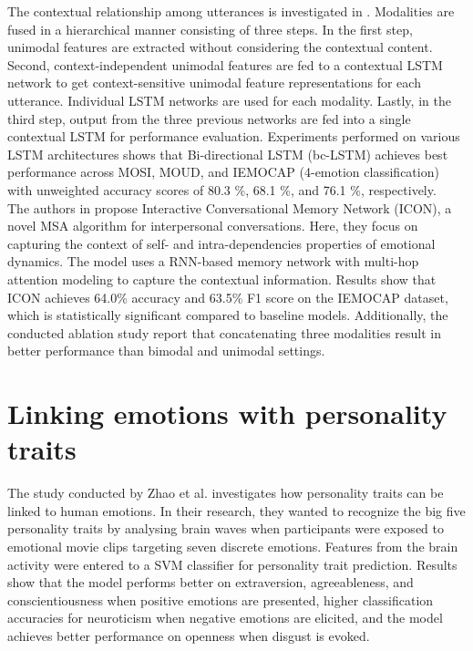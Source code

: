 The contextual relationship among utterances is investigated in \cite{bc-LSTM_poria2017context}. Modalities are fused in a hierarchical manner consisting of three steps. In the first step, unimodal features are extracted without considering the contextual content. Second, context-independent  unimodal features are fed to a contextual LSTM network to get context-sensitive unimodal feature representations for each utterance. Individual LSTM networks are used for each modality. Lastly, in the third step, output from the three previous networks are fed into a single contextual LSTM for performance evaluation. Experiments performed on various LSTM architectures shows that Bi-directional LSTM (bc-LSTM) achieves best performance across MOSI, MOUD, and IEMOCAP (4-emotion classification) with unweighted accuracy scores of 80.3 \%, 68.1 \%, and 76.1 \%, respectively. \\

The authors in \cite{ICON_hazarika-etal-2018-icon} propose Interactive Conversational Memory Network (ICON), a novel MSA algorithm for interpersonal conversations. Here, they focus on capturing the context of self- and intra-dependencies properties of emotional dynamics. The model uses a RNN-based memory network with multi-hop attention modeling to capture the contextual information. Results show that ICON achieves 64.0\% accuracy and 63.5\% F1 score on the IEMOCAP dataset, which is statistically significant compared to baseline models. Additionally, the conducted ablation study report that concatenating three modalities result in better performance than bimodal and unimodal settings. 

\section{Linking emotions with personality traits}
The study conducted by Zhao et al. \cite{Zhao2018} investigates how personality traits can be linked to human emotions. In their research, they wanted to recognize the big five personality traits by analysing brain waves when participants were exposed to emotional movie clips targeting seven discrete emotions. Features from the brain activity were entered to a SVM classifier for personality trait prediction. Results show that the model performs better on extraversion, agreeableness, and conscientiousness when positive emotions are presented, higher classification accuracies for neuroticism when negative emotions are elicited, and the model achieves better performance on openness when disgust is evoked. \\

